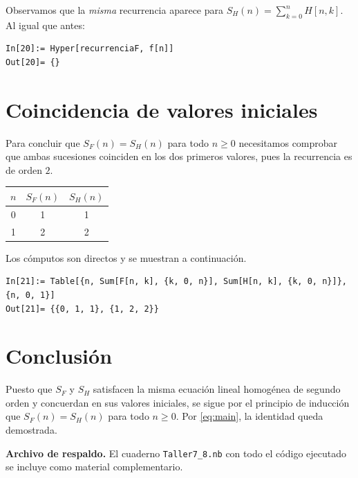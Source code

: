 \begin{solucion}
Observamos que la \emph{misma} recurrencia aparece para $S_H(n)=\sum_{k=0}^{n} H[n,k]$.  Al igual que antes:

\begin{lstlisting}
In[20]:= Hyper[recurrenciaF, f[n]]
Out[20]= {}
\end{lstlisting}

\section{Coincidencia de valores iniciales}

Para concluir que $S_F(n)=S_H(n)$ para todo $n\ge 0$ necesitamos comprobar que ambas sucesiones coinciden en
los dos primeros valores, pues la recurrencia es de orden $2$.

\begin{center}
\begin{tabular}{c|c|c}
$n$ & $S_F(n)$ & $S_H(n)$ \\ \hline
0 & 1 & 1 \\
1 & 2 & 2 \\
\end{tabular}
\end{center}

Los cómputos son directos y se muestran a continuación.

\begin{lstlisting}
In[21]:= Table[{n, Sum[F[n, k], {k, 0, n}], Sum[H[n, k], {k, 0, n}]}, {n, 0, 1}]
Out[21]= {{0, 1, 1}, {1, 2, 2}}
\end{lstlisting}

\section{Conclusión}

Puesto que $S_F$ y $S_H$ satisfacen la misma ecuación lineal homogénea de segundo orden y concuerdan en sus
valores iniciales, se sigue por el principio de inducción que $S_F(n)=S_H(n)$ para todo $n\ge 0$.  Por
\eqref{eq:main}, la identidad queda demostrada.

\bigskip
\noindent\textbf{Archivo de respaldo.} El cuaderno \texttt{Taller7\_8.nb} con todo el código ejecutado se incluye
como material complementario.
\end{solucion}